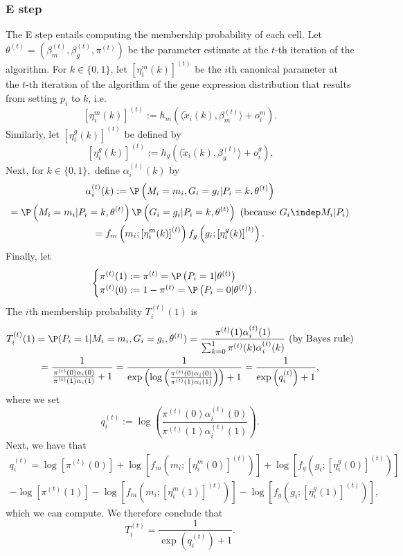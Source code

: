 \documentclass[11pt]{article}
\begin{document}
\begin{appendices}
\begin{refsection}
\subsubsection*{E step}
The E step entails computing the membership probability of each cell. Let $\theta^{(t)} = (\beta_m^{(t)}, \beta_g^{(t)}, \pi^{(t)})$ be the parameter estimate at the $t$-th iteration of the algorithm. For $k \in \{0,1\}$, let $[\eta^m_i(k)]^{(t)}$ be the $i$th canonical parameter at the $t$-th iteration of the algorithm of the gene expression distribution that results from setting $p_i$ to $k$, i.e.
$$
[\eta^m_i(k)]^{(t)} := h_m\left( \langle \tilde{x}_i(k) , \beta_m^{(t)} \rangle + o^m_i \right).
$$ Similarly, let $\left[\eta^g_i(k)\right]^{(t)}$ be defined by
$$\left[\eta^g_i(k)\right]^{(t)} :=  h_g\left( \langle \tilde{x}_i(k) , \beta_g^{(t)} \rangle + o^g_i \right).$$
Next, for $k \in \{0,1\},$ define $\alpha^{(t)}_i(k)$ by
\begin{multline*}
\alpha^{(t)}_i(k) := \P\left( M_i = m_i, G_i = g_i | P_i = k, \theta^{(t)} \right) \\ = \P\left( M_i = m_i | P_i = k, \theta^{(t)} \right) \P\left(G_i = g_i | P_i = k, \theta^{(t)} \right) \textrm{ (because $G_i \indep M_i | P_i$)} \\ = f_m\left(m_i; \left[ \eta^m_i(k) \right]^{(t)}\right) f_g\left(g_i; \left[ \eta^g_i(k) \right]^{(t)} \right).
\end{multline*}
Finally, let 
$$
\begin{cases}
\pi^{(t)}(1) := \pi^{(t)} = \P\left(P_i = 1 | \theta^{(t)} \right) \\
\pi^{(t)}(0) := 1 - \pi^{(t)} = \P\left(P_i = 0 | \theta^{(t)} \right).
\end{cases}
$$
The $i$th membership probability $T^{(t)}_i(1)$ is
\begin{multline}\label{e_step_1}
T^{(t)}_i(1) = \P(P_i = 1 | M_i = m_i, G_i = g_i, \theta^{(t)})  = \frac{\pi^{(t)}(1) \alpha^{(t)}_i(1)}{ \sum_{k=0}^1 \pi^{(t)}(k) \alpha^{(t)}_i(k)} \textrm{ (by Bayes rule)} \\ = \frac{1}{\frac{ \pi^{(t)}(0) \alpha_i(0)}{\pi^{(t)}(1) \alpha_i(1)} + 1} = \frac{1}{ \exp\left(\log\left(\frac{\pi^{(t)}(0) \alpha_i(0)}{\pi^{(t)}(1) \alpha_i(1)}\right)\right) + 1} = \frac{ 1 }{ \exp\left(q^{(t)}_i\right) + 1},
\end{multline}
where we set 
\begin{equation}\label{e_step_2}
q_i^{(t)} := \log\left(\frac{\pi^{(t)}(0) \alpha_i^{(t)}(0)}{\pi^{(t)}(1) \alpha_i^{(t)}(1)}\right).
\end{equation}
Next, we have that
\begin{multline*}
q^{(t)}_i = \log\left[ \pi^{(t)}(0) \right] + \log\left[ f_m\left(m_i; \left[ \eta^m_i(0) \right]^{(t)}\right) \right] + \log\left[ f_g\left(g_i; \left[ \eta^g_i(0) \right]^{(t)}\right) \right] \\ - \log\left[ \pi^{(t)}(1) \right] - \log\left[ f_m\left(m_i; \left[ \eta^m_i(1) \right]^{(t)}\right) \right] - \log\left[ f_g\left(g_i; \left[ \eta^g_i(1) \right]^{(t)}\right) \right],
\end{multline*}
which we can compute. We therefore conclude that
$$ T_i^{(t)} = \frac{1}{\exp\left(q^{(t)}_i\right) + 1}.$$

\end{refsection}
\end{appendices}
\end{document}
